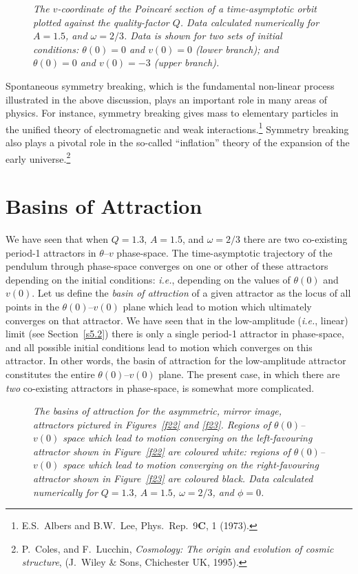 \begin{figure}
\epsfysize=2.5in
\centerline{}
\caption{\em The $v$-coordinate of the Poincar\'{e} section of a time-asymptotic orbit
plotted against the quality-factor $Q$. Data
 calculated numerically for
$A=1.5$, and $\omega=2/3$. Data is shown for two sets of initial
conditions: $\theta(0)=0$ and $v(0)=0$ (lower branch); and $\theta(0)=0$ and $v(0)=-3$ (upper branch).}\label{fx24}
\end{figure}

Spontaneous symmetry breaking, which is the fundamental non-linear process illustrated in the
above discussion,  plays an
important role in many areas of physics. For instance, symmetry breaking gives mass
to elementary particles in the unified theory of electromagnetic and weak interactions.\footnote{E.S.~Albers
and B.W.~Lee, Phys.\ Rep.\ 9{\bf C}, 1 (1973).}
Symmetry breaking also plays a pivotal role in the so-called ``inflation'' theory of the expansion
of the early universe.\footnote{P.~Coles, and F.~Lucchin, {\em Cosmology: The origin and evolution
of cosmic structure}, (J.~Wiley \& Sons, Chichester UK, 1995).}

\section{Basins of Attraction}
We have seen that when $Q=1.3$, $A=1.5$, and $\omega=2/3$ there are two co-existing
period-1 attractors in $\theta$--$v$ phase-space. The time-asymptotic trajectory of the pendulum 
through phase-space converges on one or other of these attractors depending on the initial conditions:
{\em i.e.}, depending on the values of $\theta(0)$ and $v(0)$. 
Let us define the {\em basin of attraction}\/ of a given attractor as the locus of all
points in the $\theta(0)$--$v(0)$ plane which lead to motion which ultimately converges on that attractor.
We have seen that in the low-amplitude ({\em i.e.}, linear) limit (see Section~\ref{s5.2}) there is only a
single period-1 attractor  in phase-space, and  all possible initial conditions lead to motion
which converges on this attractor. In other words,  the basin of attraction for the
low-amplitude attractor constitutes the entire $\theta(0)$--$v(0)$ plane. The present
case, in which there are {\em two} co-existing attractors in phase-space, is somewhat more complicated.

\begin{figure}
\epsfysize=3.5in
\centerline{}
\caption{\em The basins of attraction for the asymmetric, mirror image, attractors
pictured in Figures~\ref{f22} and \ref{f23}. Regions of $\theta(0)$--$v(0)$
space which lead to motion converging on the left-favouring attractor shown
in Figure~\ref{f22} are coloured white: regions of $\theta(0)$--$v(0)$
space which lead to motion converging on the right-favouring attractor shown
in Figure~\ref{f23} are coloured black. Data calculated numerically
for $Q=1.3$, $A=1.5$, $\omega=2/3$, and $\phi=0$.
}\label{f25}
\end{figure}

